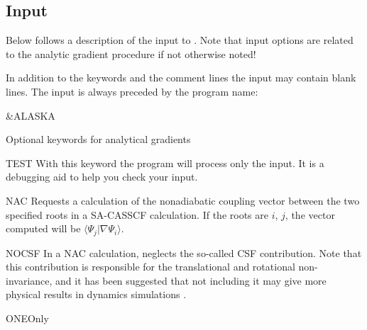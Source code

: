 \subsection{Input}
\label{UG:sec:alaska_input}
Below follows a description of the input to .
Note that input options are related to the analytic gradient procedure if
not otherwise noted!

In addition to the keywords and the comment lines the input may contain blank
lines. The input is always preceded by the program name:
\begin{inputlisting}
 &ALASKA
\end{inputlisting}

Optional keywords for analytical gradients
\begin{keywordlist}
\item[TEST]
With this keyword the program will process only the input.
It is a debugging aid to help you check your input.
\item[NAC]
Requests a calculation of the nonadiabatic coupling vector between the
two specified roots in a SA-CASSCF calculation. If the roots are $i$,
$j$, the vector computed will be $\langle\Psi_j|\nabla\Psi_i\rangle$.
\item[NOCSF]
In a NAC calculation, neglects the so-called CSF contribution.
Note that this contribution is responsible for the translational and
rotational non-invariance, and it has been suggested that not including
it may give more physical results in dynamics simulations \cite{Fatehi2012}.
\item[ONEOnly]

\end{keywordlist}
